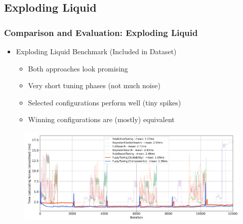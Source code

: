 \documentclass[
	10pt,
	t		%
]{beamer}
\begin{document}
\subsection{Exploding Liquid}
\begin{frame}
	\frametitle{Comparison and Evaluation: Exploding Liquid}
	\begin{itemize}
		\item Exploding Liquid Benchmark (Included in Dataset)
		      \begin{itemize}
			      \item Both approaches look promising
			      \item Very short tuning phases (not much noise)
			      \item Selected configurations perform well (tiny spikes)
			      \item Winning configurations are (mostly) equivalent
		      \end{itemize}
	\end{itemize}

	\begin{figure}
		\centering
		\includegraphics[width=1\textwidth]{figures/exploding-liquid-timings.png}
	\end{figure}
\end{frame}
\end{document}
